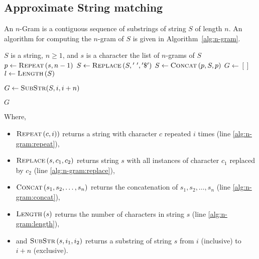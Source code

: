 	\subsection{Approximate String matching}
	\label{sec:n-gram}
		\begin{defn}[N-Gram]
			An $n$-Gram is a contiguous sequence of substrings of string $S$ of length $n$.  An algorithm for computing the $n$-gram of $S$ is given in Algorithm~\ref{alg:n-gram}.
		\end{defn}
		

		\begin{algorithm}[!ht]
			\caption{$\textsc{N-Gram}\left(S, n, s\right)$}
			\label{alg:n-gram}
			
			\begin{singlespaced}
				\begin{algorithmic}[1]
					\REQUIRE $S$ is a string, $n \ge 1$, and $s$ is a character
					\ENSURE the list of $n$-grams of $S$
					\medskip
					\STATE $p \leftarrow \textsc{Repeat}\left(s, n - 1\right)$\label{alg:n-gram:repeat}\label{alg:n-gram:p}
					\STATE $S \leftarrow \textsc{Replace}\left(S, \mathrm{'\;'}, \mathrm{'\char"24'}\right)$\label{alg:n-gram:replace}
					\STATE $S \leftarrow \textsc{Concat}\left(p, S, p\right)$\label{alg:n-gram:concat}\label{alg:n-gram:S}
					\STATE $G \leftarrow \left[\right]$\label{alg:n-gram:G}
					\STATE $l \leftarrow \textsc{Length}\left(S\right)$\label{alg:n-gram:length}
					
						\STATE $G \leftarrow \textsc{SubStr}(S, i, i + n)$
					\ENDFOR
					
					\RETURN $G$
					\medskip
					\medskip
				\end{algorithmic}
			\end{singlespaced}
		\end{algorithm}
		
		
		Where,
		 
		\begin{itemize}
			\item $\textsc{Repeat}\left(c, i)\right)$ returns a string with character $c$ repeated $i$ times (line \ref{alg:n-gram:repeat}),
			\item $\textsc{Replace}\left(s, c_1, c_2\right)$ returns string $s$ with all instances of character $c_1$ replaced by $c_2$ (line \ref{alg:n-gram:replace}),
			\item $\textsc{Concat}\left(s_1, s_2, \dotsc, s_n\right)$ returns the concatenation of $s_1, s_2, \dotsc, s_n$ (line \ref{alg:n-gram:concat}),
			\item $\textsc{Length}\left(s\right)$ returns the number of characters in string $s$ (line \ref{alg:n-gram:length}),
			\item and $\textsc{SubStr}\left(s, i_1, i_2\right)$ returns a substring of string $s$ from $i$ (inclusive) to $i + n$ (exclusive).
		\end{itemize}
		
